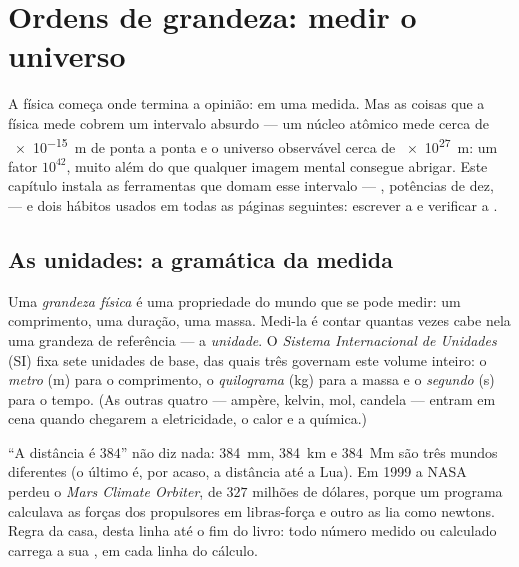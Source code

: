 \chapter{Ordens de grandeza: medir o universo}\label{ch:g10:orders-of-magnitude}

A física começa onde termina a opinião: em uma medida. Mas as coisas
que a física mede cobrem um intervalo absurdo --- um núcleo atômico
mede cerca de \qty{e-15}{m} de ponta a ponta e o universo observável
cerca de \qty{e27}{m}: um fator $10^{42}$, muito além do que qualquer
imagem mental consegue abrigar. Este capítulo instala as ferramentas
que domam esse intervalo --- , potências de dez,  --- e dois hábitos usados em todas as páginas
seguintes: escrever a  e verificar a .

\section{As unidades: a gramática da medida}

\begin{definition}\label{def:g10:orders-of-magnitude:unit}
Uma \emph{grandeza física} é uma propriedade do
mundo que se pode medir: um comprimento, uma duração, uma massa. Medi-la
é contar quantas vezes cabe nela uma grandeza de referência --- a
\emph{unidade}. O \emph{Sistema Internacional de
Unidades} (SI) fixa sete
unidades de base, das quais três governam este volume inteiro: o
\emph{metro} (\unit{m}) para o comprimento, o
\emph{quilograma} (\unit{kg}) para a massa e o
\emph{segundo} (\unit{s}) para o tempo. (As outras quatro
--- ampère, kelvin, mol, candela --- entram em cena quando chegarem a
eletricidade, o calor e a química.)
\end{definition}

\begin{remark}\label{rem:g10:orders-of-magnitude:units}
``A distância é $384$'' não diz nada: \qty{384}{mm}, \qty{384}{km} e
\qty{384}{Mm} são três mundos diferentes (o último é, por acaso, a
distância até a Lua). Em 1999 a NASA perdeu o \emph{Mars Climate
Orbiter}, de $327$ milhões de dólares, porque um programa calculava as
forças dos propulsores em libras-força e outro as lia como newtons.
Regra da casa, desta linha até o fim do livro: todo número medido ou
calculado carrega a sua , em cada linha do cálculo.
\end{remark}

